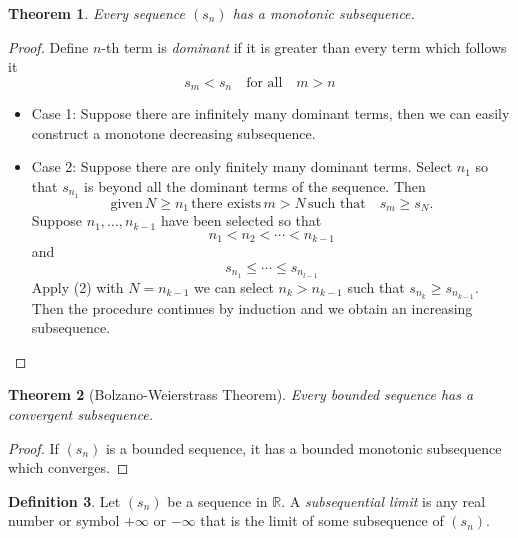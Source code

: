 \documentclass[12pt, lettersize]{book}
\theoremstyle{plain}
\newtheorem{thm}{Theorem}[section]
\theoremstyle{definition}
\newtheorem{dfn}[thm]{Definition}
\theoremstyle{remark}
\begin{document}
		\begin{thm}
		Every sequence $(s_n)$ has a monotonic subsequence.
		\end{thm}
		\setcounter{equation}{0}
		\begin{proof}
		Define $n$-th term is \emph{dominant} if it is greater than every term which follows it
		\begin{equation}
			s_m<s_n\quad\text{for all}\quad m>n
		\end{equation}
		\begin{itemize}
			\item Case 1: Suppose there are infinitely many dominant terms, then we can easily construct a monotone decreasing subsequence.
			\item Case 2: Suppose there are only finitely many dominant terms. Select $n_1$ so that $s_{n_1}$ is beyond
			all the dominant terms of the sequence. Then
			\begin{equation}
				\text{given}\,N\geq n_1\,\text{there exists}\,m>N\,\text{such that}\quad s_m\geq s_N. 
			\end{equation}
		Suppose $n_1,\dots,n_{k-1}$ have been selected so that
		\begin{equation}
			n_1<n_2<\cdots<n_{k-1}
		\end{equation}
		and
		\begin{equation}
			s_{n_1}\leq\cdots\leq s_{n_{l-1}}
		\end{equation}
		Apply (2) with $N=n_{k-1}$ we can select $n_k>n_{k-1}$ such that $s_{n_k}\geq s_{n_{k-1}}$. Then the procedure continues by induction and we obtain an increasing subsequence.
		\end{itemize}
		\end{proof}
		
		\begin{thm}[Bolzano-Weierstrass Theorem]\label{def:B-W}
			Every bounded sequence has a convergent subsequence.
		\end{thm}
		\begin{proof}
			If $(s_n)$ is a bounded sequence, it has a bounded monotonic subsequence which converges. 
		\end{proof}
		
		\begin{dfn}
		Let $(s_n)$ be a sequence in $\mathbb{R}$. A \emph{subsequential limit} is any real number or symbol $+\infty$ or $-\infty$ that is the limit of some subsequence of $(s_n)$.
		\end{dfn}
		
\end{document}
